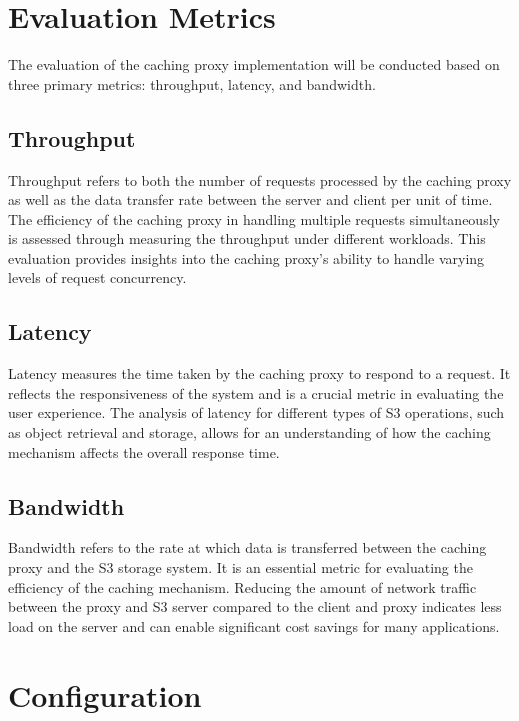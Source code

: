 \section{Evaluation Metrics}

The evaluation of the caching proxy implementation will be conducted based on three primary metrics: throughput, latency, and bandwidth.

\subsection{Throughput}

Throughput refers to both the number of requests processed by the caching proxy as well as the data transfer rate between the server and client per unit of time. The efficiency of the caching proxy in handling multiple requests simultaneously is assessed through measuring the throughput under different workloads. This evaluation provides insights into the caching proxy's ability to handle varying levels of request concurrency.

\subsection{Latency}

Latency measures the time taken by the caching proxy to respond to a request. It reflects the responsiveness of the system and is a crucial metric in evaluating the user experience. The analysis of latency for different types of S3 operations, such as object retrieval and storage, allows for an understanding of how the caching mechanism affects the overall response time.

\subsection{Bandwidth}

Bandwidth refers to the rate at which data is transferred between the caching proxy and the S3 storage system. It is an essential metric for evaluating the efficiency of the caching mechanism. Reducing the amount of network traffic between the proxy and S3 server compared to the client and proxy indicates less load on the server and can enable significant cost savings for many applications.

\section{Configuration}

